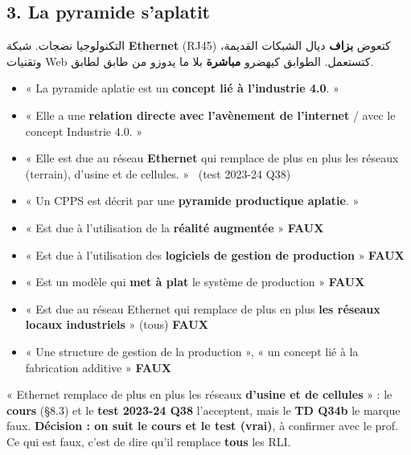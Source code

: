 \documentclass[11pt,a4paper]{article}
\newcommand{\fr}[1]{\textfrench{#1}}
\newcommand{\faux}{\textcolor{rouge}{\textbf{FAUX}}}
\begin{document}
\subsection*{3. La pyramide s'aplatit}
\par\begin{Arabic}
التكنولوجيا نضجات. شبكة \textbf{Ethernet} (\fr{RJ45}) كتعوض \textbf{بزاف} ديال الشبكات القديمة، وتقنيات \fr{Web} كتستعمل. الطوابق كيهضرو \textbf{مباشرة} بلا ما يدوزو من طابق لطابق.
\end{Arabic}
\begin{examen}
\begin{itemize}
\item « La pyramide aplatie est un \textbf{concept lié à l'industrie 4.0}. »
\item « Elle a une \textbf{relation directe avec l'avènement de l'internet} / avec le concept Industrie 4.0. »
\item « Elle est due au réseau \textbf{Ethernet} qui remplace de plus en plus les réseaux (terrain), d'usine et de cellules. » \ (test 2023-24 Q38)
\item « Un CPPS est décrit par une \textbf{pyramide productique aplatie}. »
\end{itemize}
\end{examen}
\begin{piege}
\begin{itemize}
\item « Est due à l'utilisation de la \textbf{réalité augmentée} » \faux
\item « Est due à l'utilisation des \textbf{logiciels de gestion de production} » \faux
\item « Est un modèle qui \textbf{met à plat} le système de production » \faux
\item « Est due au réseau Ethernet qui remplace de plus en plus \textbf{les réseaux locaux industriels} » (tous) \faux
\item « Une structure de gestion de la production », « un concept lié à la fabrication additive » \faux
\end{itemize}
\end{piege}
\begin{alerte}
« Ethernet remplace de plus en plus les réseaux \textbf{d'usine et de cellules} » : le \textbf{cours} (§8.3) et le \textbf{test 2023-24 Q38} l'acceptent, mais le \textbf{TD Q34b} le marque faux. \textbf{Décision : on suit le cours et le test (vrai)}, à confirmer avec le prof. Ce qui est faux, c'est de dire qu'il remplace \textbf{tous} les RLI.
\end{alerte}
\end{document}

